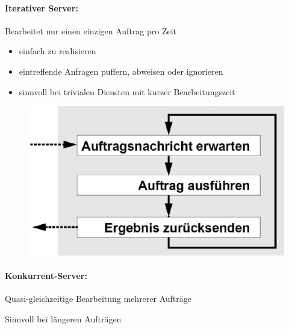\documentclass[10pt,a4paper]{article}
\begin{document}
\paragraph{Iterativer Server: }Bearbeitet nur einen einzigen Auftrag pro Zeit
\begin{itemize}
\item einfach zu realisieren
\item eintreffende Anfragen puffern, abweisen oder ignorieren
\item sinnvoll bei trivialen Diensten mit kurzer Bearbeitungszeit
\end{itemize}
\begin{figure}[h]
\includegraphics[scale=0.5]{./Bilder/Iterativer_Server}
\end{figure}

\paragraph{Konkurrent-Server: }Quasi-gleichzeitige Bearbeitung mehrerer Aufträge

Sinnvoll bei längeren Aufträgen
\end{document}
